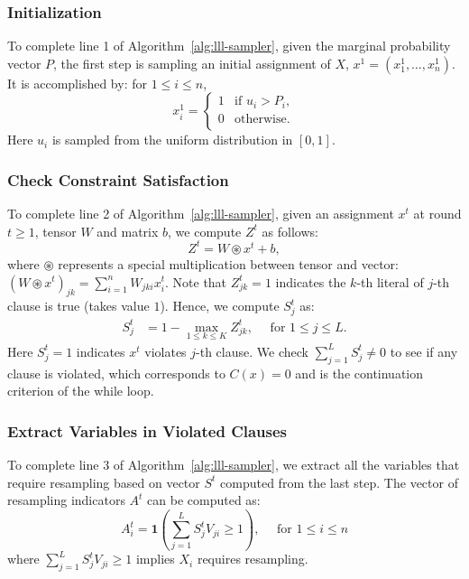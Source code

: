 \subsubsection*{Initialization} To complete line 1 of Algorithm~\ref{alg:lll-sampler}, given the marginal
probability vector $P$, the first step is sampling an initial assignment of
$X$, $x^1=(x^1_1, \ldots, x^1_n)$. It is accomplished by: for $1\le i\le n$,
\begin{equation}
    x^1_{i} = \begin{cases}
        1 & \text{if } u_i> P_i, \\
        0 & \text{otherwise}.    \\
    \end{cases}
\end{equation}
Here $u_i$ is sampled from the uniform distribution in $[0,1]$.

\subsubsection*{Check Constraint Satisfaction} To complete line 2 of Algorithm~\ref{alg:lll-sampler}, given an assignment
$x^t$ at round $t\ge 1$, tensor $W$ and matrix $b$, we compute $Z^t$ as
follows:
\begin{equation}\label{eq:Zt}
    Z^t =W \circledast  x^t+b,
\end{equation}
where  $\circledast$ represents a special  multiplication between tensor and vector: $(W \circledast x^t)_{j k}=\sum_{i=1}^n W_{j k i} x^t_i$.
%
Note that $Z^t_{jk}=1$ indicates the $k$-th literal of $j$-th clause is true
(takes value $1$). Hence, we compute $S^t_j$ as:
\begin{align}\label{notation:C}
    S^t_j & =1-\max_{1\le k\le K} Z^t_{jk}, \quad \text{ for } 1\le j\le L.
\end{align}
Here $S^t_j=1$ indicates $x^t$ violates $j$-th clause.
%
We check $\sum_{j=1}^LS^t_j\neq 0$ to see if any clause is violated, which
corresponds to $C(x)= 0$ and is the continuation criterion of the while loop.
%
%

\subsubsection*{Extract Variables in Violated Clauses} To complete line 3 of Algorithm~\ref{alg:lll-sampler}, we extract all the
variables that require resampling based on vector $S^t$ computed from the last
step. The vector of resampling indicators $A^t$ can be computed as:
\begin{equation}
    A^t_i=\mathbf{1}\left(\sum_{j=1}^L{S_j^t} V_{ji}\ge 1\right),\quad \text{ for } 1\le i\le n
\end{equation}
where $\sum_{j=1}^L{S_j^t} V_{ji}\ge 1$ implies $X_i$ requires resampling.

